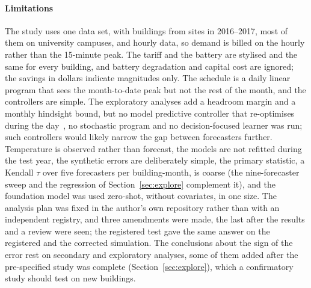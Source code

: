 \paragraph{Limitations} The study uses one data set, with buildings from  sites in 2016--2017, most of them on university campuses, and hourly data, so demand is billed on the hourly rather than the 15-minute peak. The tariff and the battery are stylised and the same for every building, and battery degradation and capital cost are ignored; the savings in dollars indicate magnitudes only. The schedule is a daily linear program that sees the month-to-date peak but not the rest of the month, and the controllers are simple. The exploratory analyses add a headroom margin and a monthly hindsight bound, but no model predictive controller that re-optimises during the day~\cite{mary2025rmpc,cortesaguirre2025empc}, no stochastic program and no decision-focused learner was run; such controllers would likely narrow the gap between forecasters further. Temperature is observed rather than forecast, the models are not refitted during the test year, the synthetic errors are deliberately simple, the primary statistic, a Kendall $\tau$ over five forecasters per building-month, is coarse (the nine-forecaster sweep and the regression of Section~\ref{sec:explore} complement it), and the foundation model was used zero-shot, without covariates, in one size. The analysis plan was fixed in the author's own repository rather than with an independent registry, and three amendments were made, the last after the results and a review were seen; the registered test gave the same answer on the registered and the corrected simulation. The conclusions about the sign of the error rest on secondary and exploratory analyses, some of them added after the pre-specified study was complete (Section~\ref{sec:explore}), which a confirmatory study should test on new buildings.
